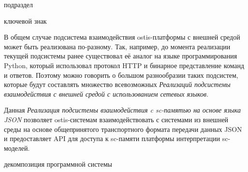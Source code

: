 \begin{SCn}

\begin{scnrelfromlist}{подраздел}
\end{scnrelfromlist}

\begin{scnrelfromlist}{ключевой знак}
\end{scnrelfromlist}

\end{SCn}

\bigskip

В общем случае подсистема взаимодействия ostis-платформы с внешней средой может быть реализована по-разному. Так, например, до момента реализации текущей подсистемы ранее существовал её аналог на языке программирования Python, который использовал протокол HTTP и бинарное представление команд и ответов.
Поэтому можно говорить о большом разнообразии таких подсистем, которые будут составлять множество всевозможных \textit{Реализаций подсистемы взаимодействия с внешней средой с использованием сетевых языков}.

Данная \textit{Реализация подсистемы взаимодействия c sc-памятью на основе языка JSON} позволяет ostis-системам взаимодействовать с системами из внешней среды на основе общепринятого транспортного формата передачи данных JSON и предоставляет API для доступа к sc-памяти платформы интерпретации sc-моделей.

\begin{SCn}
\begin{scnrelfromset}{декомпозиция программной системы}
\end{scnrelfromset}
\end{SCn}

